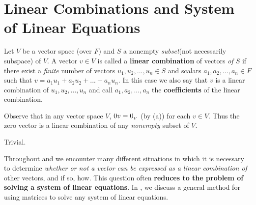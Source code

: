 \section{Linear Combinations and System of Linear Equations} \label{sec 1.4}

\begin{definition} \label{def 1.3}
Let \(V\) be a vector space (over \(F\)) and \(S\) a nonempty \emph{subset}(not necessarily subspace) of \(V\).
A vector \(v \in V\) is called a \textbf{linear combination} of vectors \emph{of \(S\)} if there exist a \emph{finite} number of vectors \(u_1, u_2, ..., u_n \in S\) and scalars \(a_1, a_2, ..., a_n \in F\) such that \(v = a_1 u_1 + a_2 u_2 + ... + a_n u_n\).
In this case we also say that \(v\) is a linear combination of \(u_1, u_2, ..., u_n\) and call \(a_1, a_2, ..., a_n\) the \textbf{coefficients}
of the linear combination.
\end{definition}

\begin{note}
Observe that in any vector space \(V\), \(0v = 0_{_V}\) (by (a)) for each \(v \in V\).
Thus the zero vector is a linear combination of any \emph{nonempty} subset of \(V\).
\end{note}

\begin{example}
Trivial.
\end{example}

Throughout  and  we encounter many different situations in which it is necessary to determine \emph{whether or not a vector can be expressed as a linear combination of} other vectors, and if so, how. 
This question often \textbf{reduces to the problem of solving a system of linear equations}.
In , we discuss a general method for using matrices to solve any system of linear equations.

